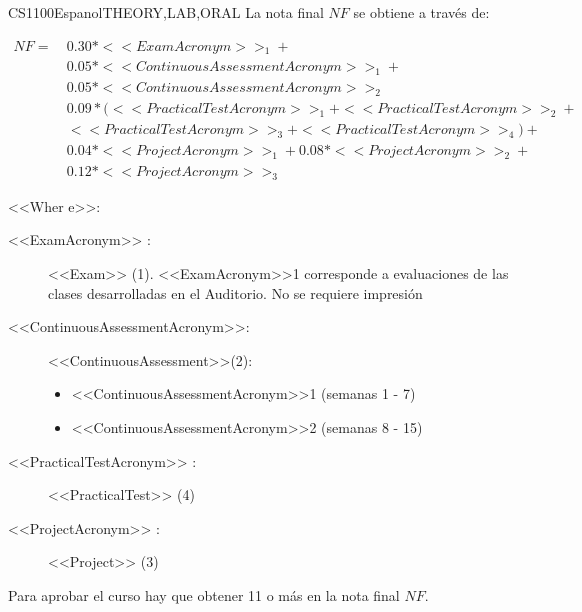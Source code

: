     
    \begin{evaluation}{CS1100}{Espanol}{THEORY,LAB,ORAL}
    La nota final $NF$ se obtiene a través de:
    
    \begin{equation}
       \begin{split}
      NF  =~ & 0.30*<<ExamAcronym>>_{1}  + \\
                 & 0.05*<<ContinuousAssessmentAcronym>>_{1} +\\
                 & 0.05*<<ContinuousAssessmentAcronym>>_{2}  \\
                 & 0.09*(<<PracticalTestAcronym>>_{1} + <<PracticalTestAcronym>>_{2} +\\
              &  <<PracticalTestAcronym>>_{3} + <<PracticalTestAcronym>>_{4}) + \\
                 & 0.04*<<ProjectAcronym>>_{1} + 0.08*<<ProjectAcronym>>_{2} +\\
              &  0.12*<<ProjectAcronym>>_{3}
       \end{split}
    \end{equation}
    
    
    \noindent <<Wher
    e>>:
    \begin{description}
       \item[<<ExamAcronym>> :] <<Exam>> (1). <<ExamAcronym>>1 corresponde a evaluaciones de las clases desarrolladas en el Auditorio.  No se requiere impresión
      \item[<<ContinuousAssessmentAcronym>>:]<<ContinuousAssessment>>(2):
        \begin{itemize}
               \item <<ContinuousAssessmentAcronym>>1 (semanas 1 - 7)  
               \item <<ContinuousAssessmentAcronym>>2 (semanas 8 - 15)
         \end{itemize}
      \item[<<PracticalTestAcronym>> :] <<PracticalTest>>  (4)
      \item[<<ProjectAcronym>> :] <<Project>> (3)
    \end{description}
    
    \noindent Para aprobar el curso hay que obtener 11 o más en la nota final $NF$.
    \end{evaluation}
    
